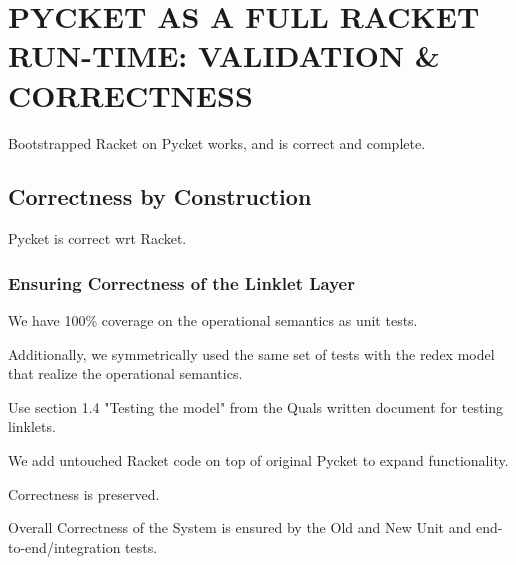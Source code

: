 \chapter[\texorpdfstring{PYCKET AS A FULL RACKET RUN-TIME: VALIDATION \& CORRECTNESS}
                          {5. Validation \& Correctness}]{PYCKET AS A FULL RACKET RUN-TIME: VALIDATION \& CORRECTNESS}

	\label{chapter:validation}

	\begin{chaptersynopsis}
		Bootstrapped Racket on Pycket works, and is correct and complete.
	\end{chaptersynopsis}


	\section{Correctness by Construction}

		\begin{mainpoint}
			Pycket is correct wrt Racket.
		\end{mainpoint}

		\subsection{Ensuring Correctness of the Linklet Layer}
			\begin{mainpoint}
				We have 100\% coverage on the operational semantics as unit tests.

				Additionally, we symmetrically used the same set of tests with the redex model that realize the operational semantics.
			\end{mainpoint}

			\begin{todo}[Import]
				Use section 1.4 "Testing the model" from the Quals written document for testing linklets.
			\end{todo}

		\begin{paragraph-here}
			We add untouched Racket code on top of original Pycket to expand functionality.

				Correctness is preserved.
		\end{paragraph-here}

		\begin{paragraph-here}
			Overall Correctness of the System is ensured by the Old and New Unit and end-to-end/integration tests.
		\end{paragraph-here}

